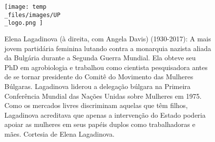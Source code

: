 \begin{figure}
	\centering
	\texttt{[image: temp\\\_files/images/UP\\\_logo.png ]}
	\caption{Elena Lagadinova (à direita, com Angela Davis) (1930-2017): A mais jovem partidária feminina lutando contra a monarquia nazista aliada da Bulgária durante a Segunda Guerra Mundial. Ela obteve seu PhD em agrobiologia e trabalhou como cientista pesquisadora antes de se tornar presidente do Comitê do Movimento das Mulheres Búlgaras. Lagadinova liderou a delegação búlgara na Primeira Conferência Mundial das Nações Unidas sobre Mulheres em 1975. Como os mercados livres discriminam aquelas que têm filhos, Lagadinova acreditava que apenas a intervenção do Estado poderia apoiar as mulheres em seus papéis duplos como trabalhadoras e mães. Cortesia de Elena Lagadinova.}
	\label{ }
\end{figure}
 \par 
